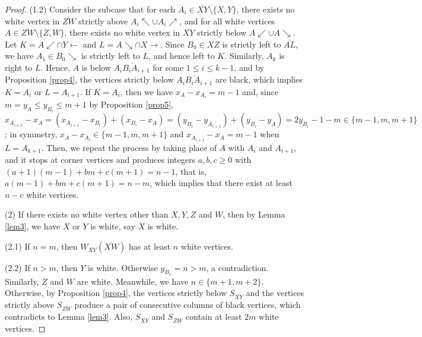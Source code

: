 \documentclass[preprint,12pt]{elsarticle}
\def\NEarrow#1{#1{\nearrow}}
\def\SEarrow#1{#1{\searrow}}
\def\NWarrow#1{#1{\nwarrow}}
\def\SWarrow#1{#1{\swarrow}}
\def\Westarrow#1{#1{\leftarrow}}
\def\Eastarrow#1{#1{\rightarrow}}
\begin{document}
{\begin{proof}
(1.2)
Consider the subcase that
for each $A_i\in\overline{XY}\setminus\{X,Y\}$,
there exists no white vertex in $\overline{ZW}$
strictly above $\NWarrow{A_i}\cup \NEarrow{A_i}$, and
for all white vertices $A\in\overline{ZW}\setminus\{Z,W\}$,
there exists no white vertex in $\overline{XY}$
strictly below $\SWarrow{A}\cup \SEarrow{A}$.
Let $K=\SWarrow{A}\cap \Westarrow{Y}$ and $L=\SEarrow{A}\cap \Eastarrow{X}$.
Since $B_0\in\overline{XZ}$ is strictly left to $\overline{AL}$,
we have $A_1\in \SEarrow{B_0}$ is strictly left to $L$, and hence left to $K$.
Similarly, $A_k$ is right to $L$.
Hence, $A$ is below $\overline{A_iB_iA_{i+1}}$ for some $1\leq i\leq k-1$,
and by Proposition \ref{prop4},
the vertices strictly below $\overline{A_iB_iA_{i+1}}$ are black,
which implies $K=A_i$ or $L=A_{i+1}$.
If $K=A_i$, then we have $x_A-x_{A_i}=m-1$
and, since $m =y_A \le y_{B_i} \le m+1$ by Proposition \ref{prop5},
$x_{A_{i+1}}-x_{A}
=(x_{A_{i+1}}-x_{B_i})+(x_{B_i}-x_{A})
=(y_{B_i}-y_{A_{i+1}})+(y_{B_i}-y_{A})
=2y_{B_i}-1-m\in\{m-1,m,m+1\}$;
in symmetry, $x_A-x_{A_i}\in\{m-1,m,m+1\}$ and $x_{A_{i+1}}-x_A=m-1$ when $L=A_{k+1}$.
Then, we repeat the process by taking place of $A$ with $A_i$ and $A_{i+1}$,
and it stops at corner vertices
and produces integers $a,b,c\ge 0$ with $(a+1)(m-1)+bm+c(m+1)=n-1$,
that is, $a(m-1)+bm+c(m+1)=n-m$,
which implies that there exist at least $n-c$ white vertices.

(2)
If there exists no white vertex other than $X,Y,Z$ and $W$,
then by Lemma \ref{lem3}, we have $X$ or $Y$ is white, say $X$ is white.

(2.1)
If $n=m$, then $W_{\overline{XY}}(\overline{XW})$ has at least $n$ white vertices.

(2.2)
If $n>m$, then $Y$ is white. Otherwise
$y_{B_{1}}=n> m$, a contradiction.
Similarly, $Z$ and $W$ are white.
Meanwhile, we have $n\in\{m+1,m+2\}$. Otherwise, by Proposition \ref{prop4},
the vertices strictly below $S_{\overline{XY}}$
and the vertices strictly above $S_{\overline{ZW}}$
produce a pair of consecutive columns of black vertices,
which contradicts to Lemma \ref{lem3}.
Also, $S_{\overline{XY}}$ and $S_{\overline{ZW}}$ contain at least $2m$ white vertices.


\end{proof}}
\end{document}
